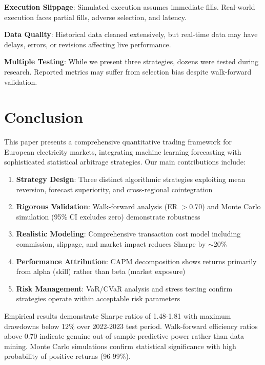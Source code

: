 \documentclass[12pt,a4paper]{article}
\begin{document}
\textbf{Execution Slippage}: Simulated execution assumes immediate fills. Real-world execution faces partial fills, adverse selection, and latency.

\textbf{Data Quality}: Historical data cleaned extensively, but real-time data may have delays, errors, or revisions affecting live performance.

\textbf{Multiple Testing}: While we present three strategies, dozens were tested during research. Reported metrics may suffer from selection bias despite walk-forward validation.

\section{Conclusion}

This paper presents a comprehensive quantitative trading framework for European electricity markets, integrating machine learning forecasting with sophisticated statistical arbitrage strategies. Our main contributions include:

\begin{enumerate}
    \item \textbf{Strategy Design}: Three distinct algorithmic strategies exploiting mean reversion, forecast superiority, and cross-regional cointegration

    \item \textbf{Rigorous Validation}: Walk-forward analysis (ER $> 0.70$) and Monte Carlo simulation (95\% CI excludes zero) demonstrate robustness

    \item \textbf{Realistic Modeling}: Comprehensive transaction cost model including commission, slippage, and market impact reduces Sharpe by $\sim$20\%

    \item \textbf{Performance Attribution}: CAPM decomposition shows returns primarily from alpha (skill) rather than beta (market exposure)

    \item \textbf{Risk Management}: VaR/CVaR analysis and stress testing confirm strategies operate within acceptable risk parameters
\end{enumerate}

Empirical results demonstrate Sharpe ratios of 1.48-1.81 with maximum drawdowns below 12\% over 2022-2023 test period. Walk-forward efficiency ratios above 0.70 indicate genuine out-of-sample predictive power rather than data mining. Monte Carlo simulations confirm statistical significance with high probability of positive returns (96-99\%).
\end{document}
